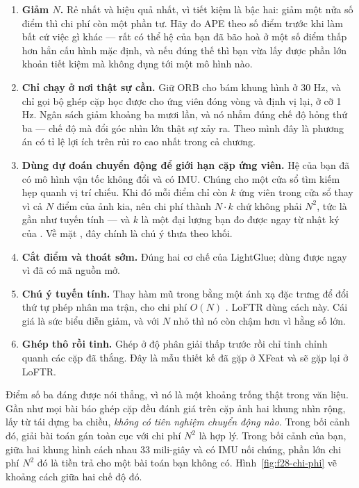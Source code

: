 \documentclass[../../deep_learning.tex]{subfiles}
\begin{document}
\begin{enumerate}
\item \textbf{Giảm \(N\).} Rẻ nhất và hiệu quả nhất, vì tiết kiệm là bậc hai: giảm một nửa số điểm thì chi phí còn một phần tư. Hãy đo APE theo số điểm trước khi làm bất cứ việc gì khác --- rất có thể hệ của bạn đã bão hoà ở một số điểm thấp hơn hẳn cấu hình mặc định, và nếu đúng thế thì bạn vừa lấy được phần lớn khoản tiết kiệm mà không đụng tới một mô hình nào.
\item \textbf{Chỉ chạy ở nơi thật sự cần.} Giữ ORB cho bám khung hình ở 30 Hz, và chỉ gọi bộ ghép cặp học được cho ứng viên đóng vòng và định vị lại, ở cỡ 1 Hz. Ngân sách giảm khoảng ba mươi lần, và nó nhắm đúng chế độ hỏng thứ ba --- chế độ mà đổi góc nhìn lớn thật sự xảy ra. Theo mình đây là phương án có tỉ lệ lợi ích trên rủi ro cao nhất trong cả chương.
\item \textbf{Dùng dự đoán chuyển động để giới hạn cặp ứng viên.} Hệ của bạn đã có mô hình vận tốc không đổi và có IMU. Chúng cho một cửa sổ tìm kiếm hẹp quanh vị trí chiếu. Khi đó mỗi điểm chỉ còn \(k\) ứng viên trong cửa sổ thay vì cả \(N\) điểm của ảnh kia, nên chi phí thành \(N \cdot k\) chứ không phải \(N^2\), tức là gần như tuyến tính --- và \(k\) là một đại lượng bạn đo được ngay từ nhật ký của . Về mặt , đây chính là chú ý thưa theo khối.
\item \textbf{Cắt điểm và thoát sớm.} Đúng hai cơ chế của LightGlue; dùng được ngay vì đã có mã nguồn mở.
\item \textbf{Chú ý tuyến tính.} Thay hàm mũ trong  bằng một ánh xạ đặc trưng để đổi thứ tự phép nhân ma trận, cho chi phí \(O(N)\) \cite{katharopoulos2020linear}. LoFTR dùng cách này. Cái giá là sức biểu diễn giảm, và với \(N\) nhỏ thì nó còn chậm hơn vì hằng số lớn.
\item \textbf{Ghép thô rồi tinh.} Ghép ở độ phân giải thấp trước rồi chỉ tinh chỉnh quanh các cặp đã thắng. Đây là mẫu thiết kế đã gặp ở XFeat và sẽ gặp lại ở LoFTR.
\end{enumerate}

Điểm số ba đáng được nói thẳng, vì nó là một khoảng trống thật trong văn liệu. Gần như mọi bài báo ghép cặp đều đánh giá trên cặp ảnh hai khung nhìn rộng, lấy từ tái dựng ba chiều, \emph{không có tiên nghiệm chuyển động nào}. Trong bối cảnh đó, giải bài toán gán toàn cục với chi phí \(N^2\) là hợp lý. Trong bối cảnh của bạn, giữa hai khung hình cách nhau 33 mili-giây và có IMU nối chúng, phần lớn chi phí \(N^2\) đó là tiền trả cho một bài toán bạn không có. Hình~\ref{fig:f28-chi-phi} vẽ khoảng cách giữa hai chế độ đó.
\end{document}

